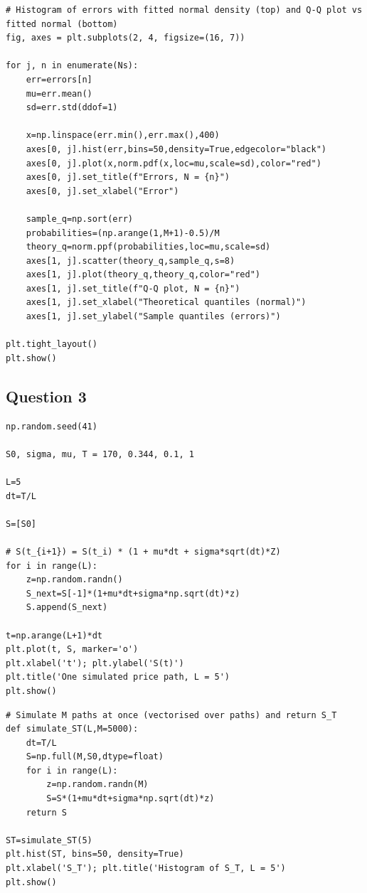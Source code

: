 \documentclass[11pt,a4paper]{article}
\begin{document}
\begin{lstlisting}[caption={Q2: histograms with fitted normal density and Q-Q plots of the errors.}, label={lst:q2-normality}]
# Histogram of errors with fitted normal density (top) and Q-Q plot vs fitted normal (bottom)
fig, axes = plt.subplots(2, 4, figsize=(16, 7))

for j, n in enumerate(Ns):
    err=errors[n]
    mu=err.mean()
    sd=err.std(ddof=1)

    x=np.linspace(err.min(),err.max(),400)
    axes[0, j].hist(err,bins=50,density=True,edgecolor="black")
    axes[0, j].plot(x,norm.pdf(x,loc=mu,scale=sd),color="red")
    axes[0, j].set_title(f"Errors, N = {n}")
    axes[0, j].set_xlabel("Error")

    sample_q=np.sort(err)
    probabilities=(np.arange(1,M+1)-0.5)/M
    theory_q=norm.ppf(probabilities,loc=mu,scale=sd)
    axes[1, j].scatter(theory_q,sample_q,s=8)
    axes[1, j].plot(theory_q,theory_q,color="red")
    axes[1, j].set_title(f"Q-Q plot, N = {n}")
    axes[1, j].set_xlabel("Theoretical quantiles (normal)")
    axes[1, j].set_ylabel("Sample quantiles (errors)")

plt.tight_layout()
plt.show()
\end{lstlisting}

\subsection{Question 3}

\begin{lstlisting}[caption={Q3a: one path of the discrete price model, $L=5$.}, label={lst:q3a-path}]
np.random.seed(41)

S0, sigma, mu, T = 170, 0.344, 0.1, 1

L=5
dt=T/L

S=[S0]

# S(t_{i+1}) = S(t_i) * (1 + mu*dt + sigma*sqrt(dt)*Z)
for i in range(L):
    z=np.random.randn()
    S_next=S[-1]*(1+mu*dt+sigma*np.sqrt(dt)*z)
    S.append(S_next)

t=np.arange(L+1)*dt
plt.plot(t, S, marker='o')
plt.xlabel('t'); plt.ylabel('S(t)')
plt.title('One simulated price path, L = 5')
plt.show()
\end{lstlisting}

\begin{lstlisting}[caption={Q3a: $M=5000$ simulations of $S_T$ and histogram for $L=5$.}, label={lst:q3a-hist}]
# Simulate M paths at once (vectorised over paths) and return S_T
def simulate_ST(L,M=5000):
    dt=T/L
    S=np.full(M,S0,dtype=float)
    for i in range(L):
        z=np.random.randn(M)
        S=S*(1+mu*dt+sigma*np.sqrt(dt)*z)
    return S

ST=simulate_ST(5)
plt.hist(ST, bins=50, density=True)
plt.xlabel('S_T'); plt.title('Histogram of S_T, L = 5')
plt.show()
\end{lstlisting}
\end{document}
